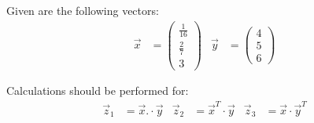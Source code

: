 Given are the following vectors:
\begin{align*}
	\vec{x}&=\begin{pmatrix}
		\frac{1}{16} \\ \frac{2}{7} \\ 3
	\end{pmatrix} &
	\vec{y}&=\begin{pmatrix}
		4 \\ 5 \\ 6
	\end{pmatrix}
\end{align*}

Calculations should be performed for:
\begin{align*}
	\vec{z}_1&=\vec{x}.\cdot\vec{y} & \vec{z}_2&=\vec{x}^T\cdot\vec{y} & \vec{z}_3&=\vec{x}\cdot\vec{y}^T
\end{align*}

